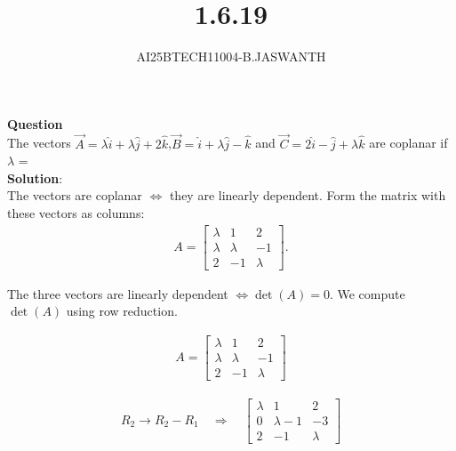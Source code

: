 \documentclass[journal]{IEEEtran}
\begin{document}

\vspace{3cm}


\renewcommand{\thetable}{\theenumi}




\vspace{3cm}


\title{1.6.19}
\author{AI25BTECH11004-B.JASWANTH}
{\let\newpage\relax\maketitle}


\renewcommand{\thefigure}{\theenumi}
\renewcommand{\thetable}{\theenumi}
\setlength{\intextsep}{10pt} %

\textbf{Question}\\
The vectors $\vec{A} = \lambda \hat{i} + \lambda \hat{j} + 2 \hat{k}$,$\vec{B} = \hat{i} + \lambda \hat{j} - \hat{k}$ and $\vec{C} = 2\hat{i} - \hat{j} + \lambda \hat{k}$ are coplanar if $\lambda$ =\\ 
\textbf{Solution}:\\ 

The vectors are coplanar $\iff$ they are linearly dependent.  
Form the matrix with these vectors as columns:
\begin{align}
A = 
\begin{bmatrix}
\lambda & 1 & 2 \\[4pt]
\lambda & \lambda & -1 \\[4pt]
2 & -1 & \lambda
\end{bmatrix}.
\end{align}

The three vectors are linearly dependent $\iff \det(A)=0$.  
We compute $\det(A)$ using row reduction.

\begin{align}
A = 
\begin{bmatrix}
\lambda & 1 & 2 \\
\lambda & \lambda & -1 \\
2 & -1 & \lambda
\end{bmatrix}
\end{align}

\begin{align}
R_2 \to R_2 - R_1 \quad \Rightarrow \quad
\begin{bmatrix}
\lambda & 1 & 2 \\
0 & \lambda-1 & -3 \\
2 & -1 & \lambda
\end{bmatrix}
\end{align}
\end{document}
